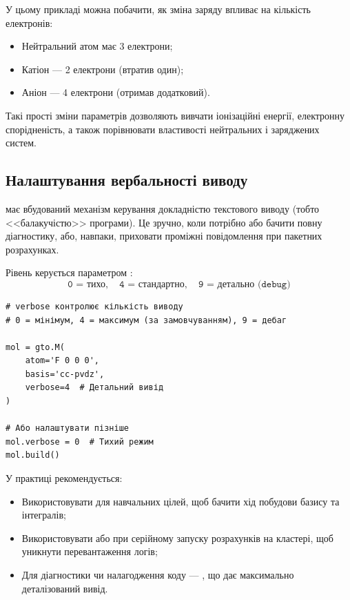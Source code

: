 У цьому прикладі можна побачити, як зміна заряду впливає на кількість електронів:
\begin{itemize}
	\item Нейтральний атом  має 3 електрони;
	\item Катіон  --- 2 електрони (втратив один);
	\item Аніон  --- 4 електрони (отримав додатковий).
\end{itemize}

Такі прості зміни параметрів дозволяють вивчати іонізаційні енергії, електронну спорідненість,
а також порівнювати властивості нейтральних і заряджених систем.

\subsection{Налаштування вербальності виводу}

\PySCF{} має вбудований механізм керування докладністю текстового виводу (тобто <<балакучістю>> програми).
Це зручно, коли потрібно або бачити повну діагностику, або, навпаки, приховати проміжні повідомлення при пакетних розрахунках.

Рівень керується параметром :
\[
	\texttt{0 = тихо}, \quad
	\texttt{4 = стандартно}, \quad
	\texttt{9 = детально (debug)}
\]

\begin{verbatim}
# verbose контролює кількість виводу
# 0 = мінімум, 4 = максимум (за замовчуванням), 9 = дебаг

mol = gto.M(
    atom='F 0 0 0',
    basis='cc-pvdz',
    verbose=4  # Детальний вивід
)

# Або налаштувати пізніше
mol.verbose = 0  # Тихий режим
mol.build()
\end{verbatim}

\noindent
У практиці рекомендується:
\begin{itemize}
	\item Використовувати  для навчальних цілей, щоб бачити хід побудови базису та інтегралів;
	\item Використовувати  або  при серійному запуску розрахунків на кластері, щоб уникнути перевантаження логів;
	\item Для діагностики чи налагодження коду --- , що дає максимально деталізований вивід.
\end{itemize}

